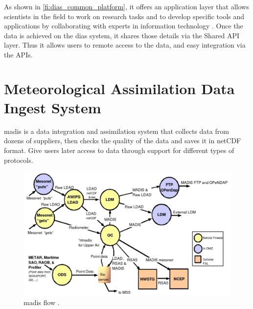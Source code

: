 As shown in \cref{fi:dias_common_platform}, it offers an application layer that allows scientists in the field to work on research tasks and to develop specific tools and applications by collaborating with experts in information technology \cite{Kawasaki2018DataReduction}. Once the data is achieved on the \acrshort{dias} system, it shares those details via the Shared API layer. Thus it allows users to remote access to the data, and easy integration via the APIs.



\section{Meteorological Assimilation Data Ingest System}
\label{se:madis}
\acrfull{madis} is a data integration and assimilation system that collects data from dozens of suppliers, then checks the quality of the data and saves it in \acrshort{netCDF} format. Give users later access to data through support for different types of protocols.

\begin{figure}[htp]
    \centering
    \includegraphics[width=1\textwidth]{lit/other/madis_flow.png}
    \caption[\acrshort{madis} flow]{\acrshort{madis} flow \cite{Macdermaid2005ARCHITECTUREP2.39}.}
    \label{fi:madis_flow}
\end{figure}


